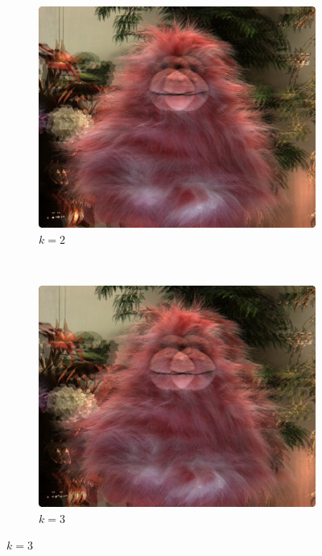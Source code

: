 \documentclass[a4paper]{article}
\begin{document}
\begin{figure}[ht]
	\vspace{2mm}
	\begin{subfigure}[h]{0.48\textwidth}
	  \includegraphics[width=\textwidth]{LinearInterpolation60_62}
	  \caption*{$k=2$}
	\end{subfigure}
    	~
	\begin{subfigure}[h]{0.48\textwidth}
	  \centering
	  \includegraphics[width=\textwidth]{LinearInterpolation60_63}
	  \caption*{$k=3$}
	\end{subfigure}
	

\end{figure}
\end{document}
